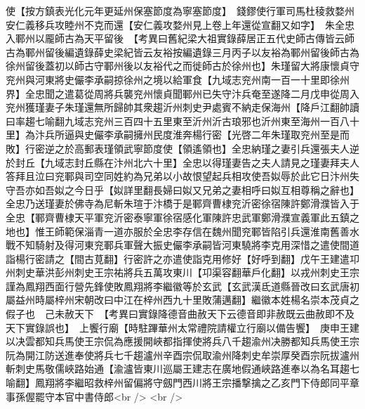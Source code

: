 使【按方鎮表光化元年更延州保塞節度為寧塞節度】　錢鏐使行軍司馬杜稜救婺州安仁義移兵攻睦州不克而還【安仁義攻婺州見上卷上年還從宣翻又如字】　朱全忠入鄆州以龎師古為天平留後　【考異曰舊紀梁大祖實錄薛居正五代史師古傳皆云師古為鄆州留後編遺錄薛史梁紀皆云友裕按編遺錄三月丙子以友裕為鄆州留後師古為徐州留後蓋初以師古守鄆州後以友裕代之而徙師古於徐州也】朱瑾留大將康懷貞守兖州與河東將史儼李承嗣掠徐州之境以給軍食【九域志兖州南一百一十里即徐州界】全忠聞之遣葛從周將兵襲兖州懷貞聞鄆州已失守汴兵奄至遂降二月戊申從周入兖州獲瑾妻子朱瑾還無所歸帥其衆趨沂州刺史尹處賓不納走保海州【降戶江翻帥讀曰率趨七喻翻九域志兖州三百四十五里東至沂州沂古琅邪也沂州東至海州一百八十里】為汴兵所逼與史儼李承嗣擁州民度淮奔楊行密【光啓二年朱瑾取兖州至是而敗】行密逆之於高郵表瑾領武寧節度使【領遙領也】全忠納瑾之妻引兵還張夫人逆於封丘【九域志封丘縣在汴州北六十里】全忠以得瑾妻告之夫人請見之瑾妻拜夫人答拜且泣曰兖鄆與司空同姓約為兄弟以小故恨望起兵相攻使吾姒辱於此它日汴州失守吾亦如吾姒之今日乎【姒詳里翻長婦曰姒又兄弟之妻相呼曰姒互相尊稱之辭也】全忠乃送瑾妻於佛寺為尼斬朱瑄于汴橋于是鄆齊曹棣兖沂密徐宿陳許鄭滑濮皆入于全忠【鄆齊曹棣天平軍兖沂密泰寧軍徐宿感化軍陳許忠武軍鄭滑濮宣義軍此五鎮之地也】惟王師範保淄青一道亦服於全忠李存信在魏州聞兖鄆皆陷引兵還淮南舊善水戰不知騎射及得河東兖鄆兵軍聲大振史儼李承嗣皆河東驍將李克用深惜之遣使間道詣楊行密請之【間古莧翻】行密許之亦遣使詣克用修好【好呼到翻】戊午王建遣卭州刺史華洪彭州刺史王宗祐將兵五萬攻東川【卭渠容翻華戶化翻】以戎州刺史王宗謹為鳳翔西面行營先鋒使敗鳳翔將李繼徽等於玄武【玄武漢氐道縣晉改曰玄武唐初屬益州時屬梓州宋朝改曰中江在梓州西九十里敗蒲邁翻】繼徽本姓楊名崇本茂貞之假子也　己未赦天下　【考異曰實錄降德音曲赦天下云德音即非赦既云曲赦即不及天下實錄誤也】　上饗行廟【時駐蹕華州太常禮院請權立行廟以備告饗】　庚申王建以决雲都知兵馬使王宗侃為應援開峽都指揮使將兵八千趨渝州决勝都知兵馬使王宗阮為開江防送進奉使將兵七千趨瀘州辛酉宗侃取渝州降刺史牟崇厚癸酉宗阮拔瀘州斬刺史馬敬儒峽路始通【渝瀘皆東川巡屬王建志在廣地假通峽路進奉以為名耳趨七喻翻】鳳翔將李繼昭救梓州留偏將守劔門西川將王宗播撃擒之乙亥門下侍郎同平章事孫偓罷守本官中書侍郎<br />
<br />
